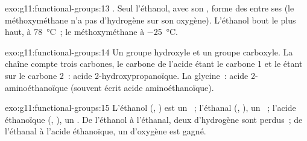 \begin{solution}{exo:g11:functional-groups:13}
. Seul l'éthanol, avec son , forme des  entre ses  (le méthoxyméthane n'a pas d'hydrogène sur
son oxygène). L'éthanol bout le plus haut, à \qty{78}{\celsius}~; le
méthoxyméthane à \qty{-25}{\celsius}.
\end{solution}

\begin{solution}{exo:g11:functional-groups:14}
Un groupe hydroxyle et un groupe carboxyle. La chaîne compte trois
carbones, le carbone de l'acide étant le carbone 1 et le  étant
sur le carbone 2~: acide 2-hydroxypropanoïque. La glycine~: acide
2-aminoéthanoïque (souvent écrit acide aminoéthanoïque).
\end{solution}

\begin{solution}{exo:g11:functional-groups:15}
L'éthanol (, ) est un ~; l'éthanal
(,
), un ~; l'acide éthanoïque (, ),
un . De l'éthanol à l'éthanal, deux  d'hydrogène
sont perdus~; de l'éthanal à l'acide éthanoïque, un  d'oxygène est
gagné.
\end{solution}

